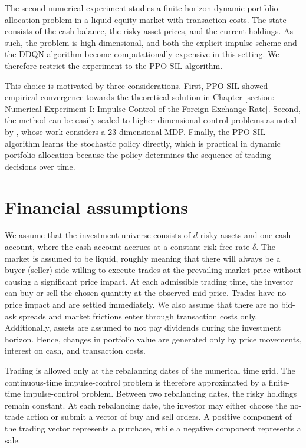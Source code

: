 \label{section: Multi-dimensional Dynamic Portfolio Allocation}
The second numerical experiment studies a finite-horizon dynamic portfolio allocation problem in a liquid equity market with transaction costs. The state consists of the cash balance, the risky asset prices, and the current holdings. As such, the problem is high-dimensional, and both the explicit-impulse scheme and the DDQN algorithm become computationally expensive in this setting. We therefore restrict the experiment to the PPO-SIL algorithm. 

This choice is motivated by three considerations. First, PPO-SIL showed empirical convergence towards the theoretical solution in Chapter \ref{section: Numerical Experiment I: Impulse Control of the Foreign Exchange Rate}. Second, the method can be easily scaled to higher-dimensional control problems as noted by \textcite{jain2025impulse}, whose work considers a 23-dimensional MDP. Finally, the PPO-SIL algorithm learns the stochastic policy directly, which is practical in dynamic portfolio allocation because the policy determines the sequence of trading decisions over time. 

\section{Financial assumptions}
\label{section: Financial Assumptions}
We assume that the investment universe consists of $d$ risky assets and one cash account, where the cash account accrues at a constant risk-free rate $\delta$. The market is assumed to be liquid, roughly meaning that there will always be a buyer (seller) side willing to execute trades at the prevailing market price without causing a significant price impact. At each admissible trading time, the investor can buy or sell the chosen quantity at the observed mid-price. Trades have no price impact and are settled immediately. We also assume that there are no bid-ask spreads and market frictions enter through transaction costs only. Additionally, assets are assumed to not pay dividends during the investment horizon. Hence, changes in portfolio value are generated only by price movements, interest on cash, and transaction costs. 

Trading is allowed only at the rebalancing dates of the numerical time grid. The continuous-time impulse-control problem is therefore approximated by a finite-time impulse-control problem. Between two rebalancing dates, the risky holdings remain constant. At each rebalancing date, the investor may either choose the no-trade action or submit a vector of buy and sell orders. A positive component of the trading vector represents a purchase, while a negative component represents a sale.

